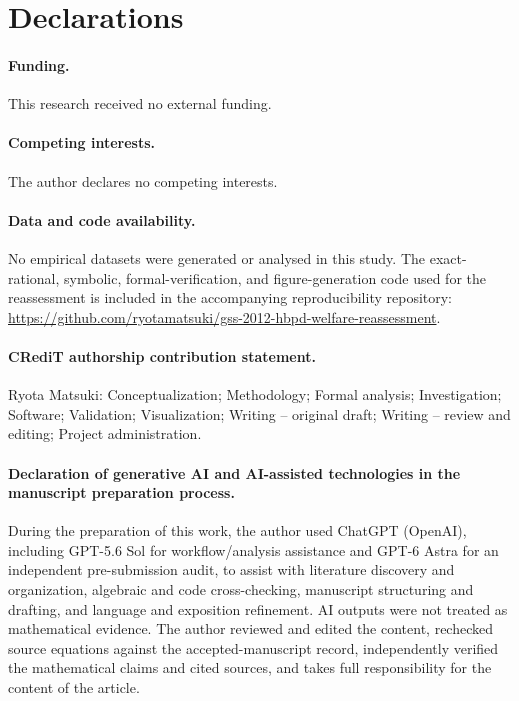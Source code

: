 \section*{Declarations}

\paragraph{Funding.}
This research received no external funding.

\paragraph{Competing interests.}
The author declares no competing interests.

\paragraph{Data and code availability.}
No empirical datasets were generated or analysed in this study. The exact-rational, symbolic, formal-verification, and figure-generation code used for the reassessment is included in the accompanying reproducibility repository:
\url{https://github.com/ryotamatsuki/gss-2012-hbpd-welfare-reassessment}.

\paragraph{CRediT authorship contribution statement.}
Ryota Matsuki: Conceptualization; Methodology; Formal analysis; Investigation; Software; Validation; Visualization; Writing -- original draft; Writing -- review and editing; Project administration.

\paragraph{Declaration of generative AI and AI-assisted technologies in the manuscript preparation process.}
During the preparation of this work, the author used ChatGPT (OpenAI), including GPT-5.6 Sol for workflow/analysis assistance and GPT-6 Astra for an independent pre-submission audit, to assist with literature discovery and organization, algebraic and code cross-checking, manuscript structuring and drafting, and language and exposition refinement. AI outputs were not treated as mathematical evidence. The author reviewed and edited the content, rechecked source equations against the accepted-manuscript record, independently verified the mathematical claims and cited sources, and takes full responsibility for the content of the article.
